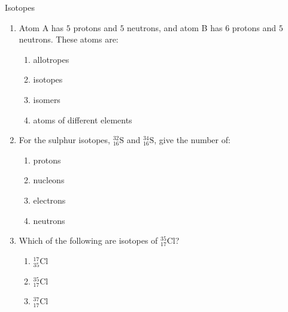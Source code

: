    \begin{exercises}  {Isotopes }
            \nopagebreak \noindent \vspace{-2cm}
        \label{m38753*id258162}\begin{enumerate}[noitemsep, label=\textbf{\arabic*}. ] 
            \label{m38753*uid50}\item Atom A has $5$ protons and $5$ neutrons, and atom B has $6$ protons and $5$ neutrons. These atoms are:
\label{m38753*id258178}\begin{enumerate}[noitemsep, label=\textbf{\alph*}. ] 
            \label{m38753*uid51}\item allotropes
\label{m38753*uid52}\item isotopes
\label{m38753*uid53}\item isomers
\label{m38753*uid54}\item atoms of different elements
\end{enumerate}
                \label{m38753*uid55}\item For the sulphur isotopes, $_{16}^{32}\text{S}$ and $_{16}^{34}\text{S}$, give the number of:
\label{m38753*id258277}\begin{enumerate}[noitemsep, label=\textbf{\alph*}. ] 
            \label{m38753*uid56}\item protons
\label{m38753*uid57}\item nucleons
\label{m38753*uid58}\item electrons
\label{m38753*uid59}\item neutrons
\end{enumerate}
                \label{m38753*uid60}\item Which of the following are isotopes of $_{17}^{35}\text{Cl}$?
\label{m38753*id258355}\begin{enumerate}[noitemsep, label=\textbf{\alph*}. ] 
            \label{m38753*uid61}\item $_{35}^{17}\text{Cl}$
\label{m38753*uid62}\item $_{17}^{35}\text{Cl}$
\label{m38753*uid63}\item $_{17}^{37}\text{Cl}$
\end{enumerate}

\end{enumerate}
\end{exercises}

